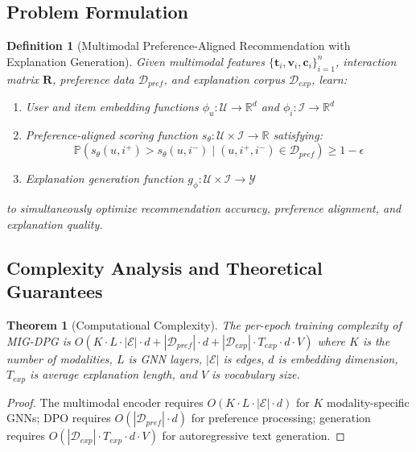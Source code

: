 \documentclass[pdflatex,sn-mathphys-num]{sn-jnl}%
\theoremstyle{thmstyleone}%
\newtheorem{theorem}{Theorem}%
\theoremstyle{thmstyletwo}%
\theoremstyle{thmstylethree}%
\newtheorem{definition}{Definition}%
\begin{document}
\subsection{Problem Formulation}

\begin{definition}[Multimodal Preference-Aligned Recommendation with Explanation Generation]
Given multimodal features $\{\mathbf{t}_i, \mathbf{v}_i, \mathbf{c}_i\}_{i=1}^n$, interaction matrix $\mathbf{R}$, preference data $\mathcal{D}_{pref}$, and explanation corpus $\mathcal{D}_{exp}$, learn:

\begin{enumerate}
\item User and item embedding functions $\phi_u: \mathcal{U} \rightarrow \mathbb{R}^d$ and $\phi_i: \mathcal{I} \rightarrow \mathbb{R}^d$
\item Preference-aligned scoring function $s_\theta: \mathcal{U} \times \mathcal{I} \rightarrow \mathbb{R}$ satisfying:
\begin{equation}
\mathbb{P}(s_\theta(u, i^+) > s_\theta(u, i^-) \mid (u, i^+, i^-) \in \mathcal{D}_{pref}) \geq 1 - \epsilon
\end{equation}
\item Explanation generation function $g_\phi: \mathcal{U} \times \mathcal{I} \rightarrow \mathcal{Y}$
\end{enumerate}

to simultaneously optimize recommendation accuracy, preference alignment, and explanation quality.
\end{definition}

\subsection{Complexity Analysis and Theoretical Guarantees}

\begin{theorem}[Computational Complexity]
The per-epoch training complexity of MIG-DPG is $O(K \cdot L \cdot |\mathcal{E}| \cdot d + |\mathcal{D}_{pref}| \cdot d + |\mathcal{D}_{exp}| \cdot T_{exp} \cdot d \cdot V)$ where $K$ is the number of modalities, $L$ is GNN layers, $|\mathcal{E}|$ is edges, $d$ is embedding dimension, $T_{exp}$ is average explanation length, and $V$ is vocabulary size.
\end{theorem}

\begin{proof}
The multimodal encoder requires $O(K \cdot L \cdot |\mathcal{E}| \cdot d)$ for $K$ modality-specific GNNs; DPO requires $O(|\mathcal{D}_{pref}| \cdot d)$ for preference processing; generation requires $O(|\mathcal{D}_{exp}| \cdot T_{exp} \cdot d \cdot V)$ for autoregressive text generation.
\end{proof}
\end{document}
